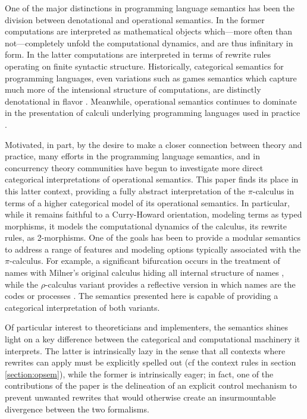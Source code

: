 \documentclass[]{acm_proc_article-sp}
\numberwithin{equation}{subsection}
\newcommand{\pic}{$\pi$-calculus}
\begin{document}
One of the major distinctions in programming language semantics has
been the division between denotational and operational semantics. In
the former computations are interpreted as mathematical objects
which---more often than not---completely unfold the computational
dynamics, and are thus infinitary in form. In the latter computations
are interpreted in terms of rewrite rules operating on finite
syntactic structure. Historically, categorical semantics for
programming languages, even variations such as games semantics
\cite{DBLP:conf/lics/McCusker96} which capture much more of the
intensional structure of computations, are distinctly denotational in
flavor \cite{DBLP:journals/iandc/Moggi91}. Meanwhile, operational
semantics continues to dominate in the presentation of calculi
underlying programming languages used in practice
\cite{DBLP:conf/aplas/MaffeisMT08}
\cite{DBLP:conf/oopsla/IgarashiPW99}
\cite{Politz:2013:PFM:2509136.2509536}.

Motivated, in part, by the desire to make a closer connection between
theory and practice, many efforts in the programming language
semantics, and in concurrency theory communities have begun to
investigate more direct categorical interpretations of operational
semantics. This paper finds its place in this latter context,
providing a fully abstract interpretation of the {\pic} in terms of a
higher categorical model of its operational semantics. In particular,
while it remains faithful to a Curry-Howard orientation, modeling
terms as typed morphisms, it models the computational dynamics of the
calculus, its rewrite rules, as 2-morphisms. One of the goals has been
to provide a modular semantics to address a range of features and
modeling options typically associated with the {\pic}. For example, a
significant bifurcation occurs in the treatment of names with Milner's
original calculus hiding all internal structure of names
\cite{milner91polyadicpi}, while the $\rho$-calculus variant provides
a reflective version in which names are the codes or processes
\cite{DBLP:journals/entcs/MeredithR05}. The semantics presented here
is capable of providing a categorical interpretation of both variants.

Of particular interest to theoreticians and implementers, the
semantics shines light on a key difference between the categorical and
computational machinery it interprets. The latter is intrinsically
lazy in the sense that all contexts where rewrites can apply must be
explicitly spelled out (cf the context rules in section
\ref{section:opsem}), while the former is intrinsically eager; in
fact, one of the contributions of the paper is the delineation of an
explicit control mechanism to prevent unwanted rewrites that would
otherwise create an insurmountable divergence between the two
formalisms. 
\end{document}
